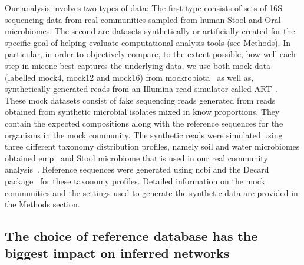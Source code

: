  Our analysis involves two types of data: The first type consists of sets of 16S sequencing data from real communities sampled from human Stool and Oral microbiomes.
  The second are datasets synthetically or artificially created for the specific goal of helping evaluate computational analysis tools (see Methods).
  In particular, in order to objectively compare, to the extent possible, how well each step in \ac{micone} best captures the underlying data, we use both mock data (labelled mock4, mock12 and mock16) from mockrobiota~\cite{Bokulich2016} as well as, synthetically generated reads from an Illumina read simulator called ART~\cite{Huang2012}.
  These mock datasets consist of fake sequencing reads generated from reads obtained from synthetic microbial isolates mixed in know proportions. They contain the expected compositions along with the reference sequences for the organisms in the mock community.
  The synthetic reads were simulated using three different taxonomy distribution profiles, namely soil and water microbiomes obtained \ac{emp}~\cite{Thompson2017} and Stool microbiome that is used in our real community analysis~\cite{Kang2017}.
  Reference sequences were generated using \ac{ncbi} and the Decard package~\cite{Golob2017} for these taxonomy profiles.
  Detailed information on the mock communities and the settings used to generate the synthetic data are provided in the Methods section.

  \FloatBarrier

  \subsection*{The choice of reference database has the biggest impact on inferred networks}

